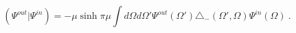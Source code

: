 \begin{equation}\label{pairing1}
\left(\Psi^{out}|\Psi^{in}\right)=-
\mu\sinh\pi\mu\int d\Omega d\Omega'
\Psi^{out}(\Omega')\triangle_-
(\Omega',\Omega)\Psi^{in}(\Omega) \ .
\end{equation}

